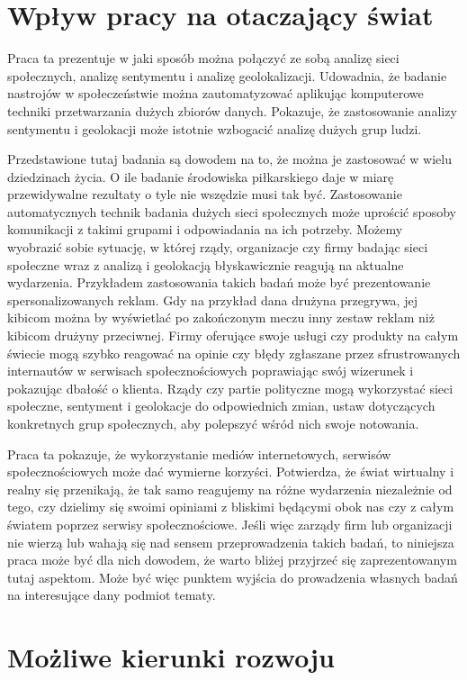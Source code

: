 \section{Wpływ pracy na otaczający świat}
Praca ta prezentuje w jaki sposób można połączyć ze sobą analizę sieci społecznych,
analizę sentymentu i analizę geolokalizacji. Udowadnia, że badanie nastrojów
w społeczeństwie można zautomatyzować aplikując komputerowe techniki przetwarzania
dużych zbiorów danych. Pokazuje, że zastosowanie analizy sentymentu i geolokacji
może istotnie wzbogacić analizę dużych grup ludzi.

Przedstawione tutaj badania są dowodem na to, że można je zastosować w wielu
dziedzinach życia. O ile badanie środowiska piłkarskiego daje w miarę
przewidywalne rezultaty o tyle nie wszędzie musi tak być.
Zastosowanie automatycznych technik badania dużych sieci społecznych
może uprościć sposoby komunikacji z takimi grupami i odpowiadania na ich potrzeby.
Możemy wyobrazić sobie sytuację, w której rządy, organizacje czy firmy badając
sieci społeczne wraz z analizą i geolokacją błyskawicznie reagują na aktualne
wydarzenia. Przykładem zastosowania takich badań może być prezentowanie
spersonalizowanych reklam. Gdy na przykład dana drużyna przegrywa, jej kibicom
można by wyświetlać po zakończonym meczu inny zestaw reklam niż kibicom drużyny 
przeciwnej. Firmy oferujące swoje usługi czy produkty na całym świecie
mogą szybko reagować na opinie czy błędy zgłaszane przez sfrustrowanych internautów
w serwisach społecznościowych poprawiając swój wizerunek i pokazując dbałość
o klienta. Rządy czy partie polityczne mogą wykorzystać sieci społeczne,
sentyment i geolokacje do odpowiednich zmian, ustaw dotyczących konkretnych grup
społecznych, aby polepszyć wśród nich swoje notowania.

Praca ta pokazuje, że wykorzystanie mediów internetowych,
serwisów społecznościowych może dać wymierne korzyści. Potwierdza, że
świat wirtualny i realny się przenikają, że tak samo reagujemy na różne wydarzenia
niezależnie od tego, czy dzielimy się swoimi opiniami z bliskimi będącymi obok
nas czy z całym światem poprzez serwisy społecznościowe. Jeśli więc zarządy
firm lub organizacji nie wierzą lub wahają się nad sensem przeprowadzenia
takich badań, to niniejsza praca może być dla nich dowodem, że warto bliżej
przyjrzeć się zaprezentowanym tutaj aspektom. Może być więc punktem wyjścia
do prowadzenia własnych badań na interesujące dany podmiot tematy.



\section{Możliwe kierunki rozwoju}


